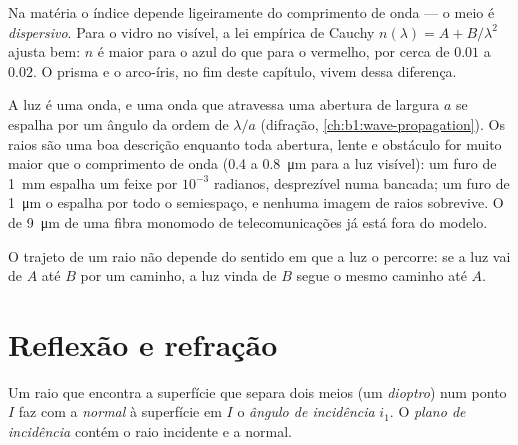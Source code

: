 \begin{remark}[Dispersão]\label{rem:b1:rays-reflection-refraction:dispersion}
Na matéria o índice depende ligeiramente do comprimento de onda --- o meio é
\emph{dispersivo}. Para o vidro no visível, a lei empírica de Cauchy
$n(\lambda) = A + B/\lambda^2$ ajusta bem: $n$ é maior para o azul do que para o
vermelho, por cerca de $0.01$ a $0.02$. O prisma e o arco-íris, no fim
deste capítulo, vivem dessa diferença.
\end{remark}

\begin{remark}\label{rem:b1:rays-reflection-refraction:limits}
A luz é uma onda, e uma onda que atravessa uma abertura de largura $a$
se espalha por um ângulo da ordem de $\lambda/a$ (difração,
\cref{ch:b1:wave-propagation}). Os raios são uma boa descrição enquanto
toda abertura, lente e obstáculo for muito maior que o comprimento de onda
(\qty{0.4}{} a \qty{0.8}{\micro m} para a luz visível): um furo de \qty{1}{mm}
espalha um feixe por $10^{-3}$ radianos, desprezível numa bancada; um
furo de \qty{1}{\micro m} o espalha por todo o semiespaço, e nenhuma imagem
de raios sobrevive. O  de \qty{9}{\micro m} de uma fibra monomodo de
telecomunicações já está fora do modelo.
\end{remark}

\begin{proposition}\label{prop:b1:rays-reflection-refraction:reversibility}
O trajeto de um raio não depende do sentido em que a luz o percorre: se a
luz vai de $A$ até $B$ por um caminho, a luz vinda de $B$
segue o mesmo caminho até $A$.
\end{proposition}
\admitted

\section{Reflexão e refração}

\begin{definition}[Incidência]\label{def:b1:rays-reflection-refraction:incidence}
Um raio que encontra a superfície que separa dois meios (um \emph{dioptro}) num
ponto $I$ faz com a \emph{normal} à superfície em $I$ o
\emph{ângulo de incidência} $i_1$. O \emph{plano de incidência} contém
o raio incidente e a normal.
\end{definition}

